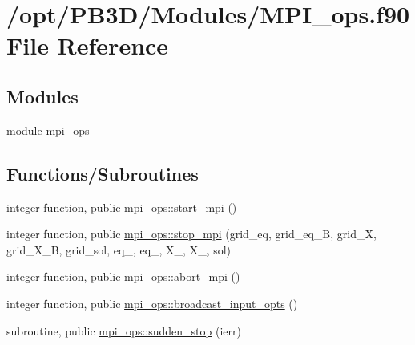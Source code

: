 \hypertarget{MPI__ops_8f90}{}\section{/opt/\+P\+B3\+D/\+Modules/\+M\+P\+I\+\_\+ops.f90 File Reference}
\label{MPI__ops_8f90}
\subsection*{Modules}
\begin{DoxyCompactItemize}
\item 
module \hyperlink{namespacempi__ops}{mpi\+\_\+ops}
\end{DoxyCompactItemize}
\subsection*{Functions/\+Subroutines}
\begin{DoxyCompactItemize}
\item 
integer function, public \hyperlink{namespacempi__ops_a804ec65ff711509de1f8873f97bdf967}{mpi\+\_\+ops\+::start\+\_\+mpi} ()
\item 
integer function, public \hyperlink{namespacempi__ops_abaf1ff6b3a25463476a767e196b4a73c}{mpi\+\_\+ops\+::stop\+\_\+mpi} (grid\+\_\+eq, grid\+\_\+eq\+\_\+B, grid\+\_\+X, grid\+\_\+\+X\+\_\+B, grid\+\_\+sol, eq\+\_, eq\+\_, X\+\_, X\+\_, sol)
\item 
integer function, public \hyperlink{namespacempi__ops_a54d9258ef985728345579e8e57dc8dfe}{mpi\+\_\+ops\+::abort\+\_\+mpi} ()
\item 
integer function, public \hyperlink{namespacempi__ops_a932eba1c998dd7a0f1191b55cd754be3}{mpi\+\_\+ops\+::broadcast\+\_\+input\+\_\+opts} ()
\item 
subroutine, public \hyperlink{namespacempi__ops_a40e8610357a9a5b075fef9dab1c3f24f}{mpi\+\_\+ops\+::sudden\+\_\+stop} (ierr)
\end{DoxyCompactItemize}

